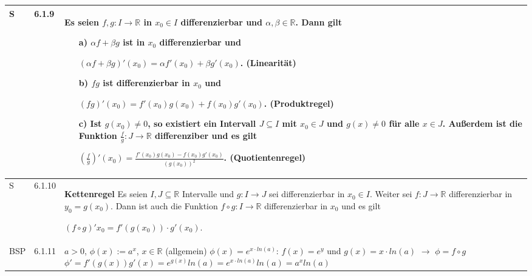     \begin{longtable}{p{0.75cm} p{1cm} p{16cm}}
        \toprule

        S   & 6.1.9 &   Es seien $f,g: I \rightarrow \mathbb{R}$ in $x_0 \in I$ differenzierbar und $\alpha,\beta \in \mathbb{R}$. Dann gilt
                        \begin{itemize}[topsep=-0.5cm]
                            \item[a)] $\alpha f +\beta g$ ist in $x_0$ differenzierbar und \hfill \break
                                        \centerline{$(\alpha f + \beta g)'(x_0) = \alpha f'(x_0) + \beta g'(x_0)$. \textbf{(Linearität)}}
                            \item[b)] $fg$ ist differenzierbar in $x_0$ und \hfill \break
                                        \centerline{$ (fg)'(x_0)=f'(x_0)g(x_0) + f(x_0)g'(x_0)$. (\textbf{Produktregel})}
                            \item[c)] Ist $g(x_0) \neq 0$, so existiert ein Intervall $J \subseteq I$ mit $x_0 \in J$ und $g(x) \neq 0$ für
                                        alle $x \in J$. Außerdem ist die Funktion $\frac{f}{g}: J \rightarrow \mathbb{R}$ 
                                        differenziber und es gilt \hfill \break
                                        \centerline{$(\frac{f}{g})'(x_0)= \frac{f'(x_0)g(x_0)-f(x_0)g'(x_0)}{(g(x_0))^2}$. (\textbf{Quotientenregel})} 
                        \end{itemize} \vspace{-0cm} \\
        \midrule
        S   & 6.1.10&   \textbf{Kettenregel} \hfill \break
                        Es seien $I, J \subseteq \mathbb{R}$ Intervalle und $g: I \rightarrow J$ sei differenzierbar in $x_0 \in I$.
                        Weiter sei $f:J \rightarrow \mathbb{R}$ differenzierbar in $y_0 = g(x_0)$. Dann ist auch die Funktion
                        $f \circ g: I \rightarrow \mathbb{R}$ differenzierbar in $x_0$ und es gilt \hfill \break
                        \centerline{$(f\circ g)'x_0 = f'(g(x_0)) \cdot g'(x_0)$.} \\
        \midrule
        BSP & 6.1.11&   $a > 0$, $\phi(x):= a^x$, $x \in \mathbb{R}$ (allgemein) \hfill \break
                        $\phi(x) = e^{x\cdot ln(a)}$: $f(x) = e^y$ und $g(x) = x\cdot ln(a)$ $\rightarrow$ $\phi = f\circ g$ \hfill \break
                        $\phi' = f'(g(x))g'(x) = e^{g(x)}ln(a) = e^{x\cdot ln(a)}ln(a) = a^xln(a)$ \\
        \midrule

\end{longtable}
